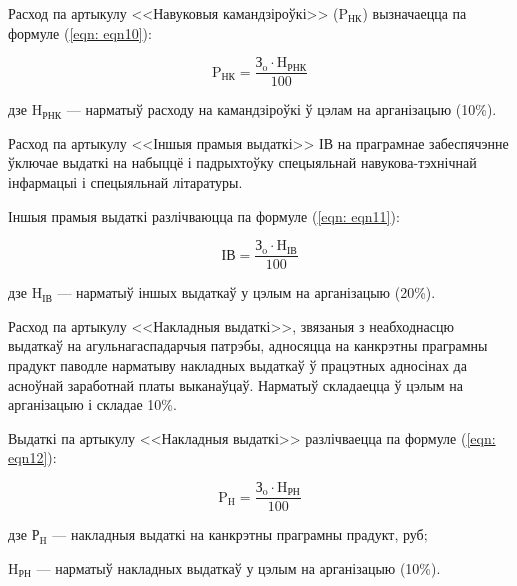 Расход па артыкулу <<Навуковыя камандзіроўкі>> ($\text{P}_\text{НК}$) вызначаецца па формуле (\ref{eqn: eqn10}):

\begin{equation}
    \label{eqn: eqn10}
    \text{P}_\text{НК} = \frac{\text{З}_\text{o} \cdot \text{H}_\text{РНК}}{100}
\end{equation}
\begin{Explanation}
    \item[дзе] $\text{H}_\text{РНК}$ --- нарматыў расходу на камандзіроўкі ў цэлам на арганізацыю (10\%).
\end{Explanation}

Расход па артыкулу <<Іншыя прамыя выдаткі>> $\text{ІВ}$ на праграмнае забеспячэнне ўключае выдаткі на набыццё і падрыхтоўку спецыяльнай навукова-тэхнічнай інфармацыі і спецыяльнай літаратуры.

Іншыя прамыя выдаткі разлічваюцца па формуле (\ref{eqn: eqn11}):

\begin{equation}
    \label{eqn: eqn11}
    \text{ІВ} = \frac{\text{З}_\text{o} \cdot \text{H}_\text{ІВ}}{100}
\end{equation}
\begin{Explanation}
    \item[дзе] $\text{H}_\text{ІВ}$ --- нарматыў іншых выдаткаў у цэлым на арганізацыю (20\%).
\end{Explanation}

Расход па артыкулу <<Накладныя выдаткі>>, звязаныя з неабходнасцю
выдаткаў на агульнагаспадарчыя патрэбы, адносяцца на канкрэтны праграмны прадукт
паводле нарматыву накладных выдаткаў ў працэтных адносінах да асноўнай заработнай платы выканаўцаў. Нарматыў складаецца ў цэлым на арганізацыю і складае 10\%.

Выдаткі па артыкулу <<Накладныя выдаткі>> разлічваецца па формуле (\ref{eqn: eqn12}):

\begin{equation}
    \label{eqn: eqn12}
    \text{P}_\text{H} = \frac{\text{З}_\text{o} \cdot \text{H}_\text{РН}}{100}
\end{equation}
\begin{Explanation}
    \item[дзе] $\text{Р}_\text{H}$ --- накладныя выдаткі на канкрэтны праграмны прадукт, руб;
    \item $\text{H}_\text{РН}$ --- нарматыў накладных выдаткаў у цэлым на арганізацыю (10\%).
\end{Explanation}

